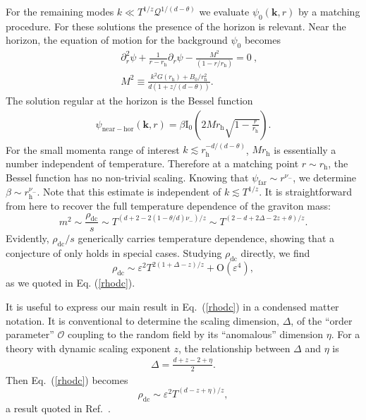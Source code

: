 \documentclass[10pt, oneside]{book}
\begin{document}
\begin{doublespace}
For the remaining modes $k \ll T^{1/z}\mathcal{Q}^{1/(d-\theta)}$ we evaluate $\psi_0(\mathbf{k},r)$ by a matching procedure. For these solutions the presence of the horizon is relevant. Near the horizon, the equation of motion for the background $\psi_0$ becomes
\begin{align}
  \label{eq:10}
  &\partial_r^2 \psi + \frac{1}{r-r_{\mathrm{h}}} \partial_r \psi - \frac{M^2}{(1-r/r_{\mathrm{h}})}=0~,\\
~~ &M^2 \equiv \frac{k^2 G(r_{\mathrm{h}}) + B_0/ r_{\mathrm{h}}^2}{d(1+z/(d-\theta))}.
\end{align}
The solution regular at the horizon is the Bessel function
\begin{align}
  \label{eq:11}
  \psi_{\mathrm{near-hor}}(\mathbf{k},r) = \beta \mathrm{I}_0 \left(2M r_{\mathrm{h}}\sqrt{1-\frac{r}{r_{\mathrm{h}}}} \right).
\end{align}
For the small momenta range of interest  $k \lesssim r_{\mathrm{h}}^{-d/(d-\theta)}$, $M r_{\mathrm{h}}$ is essentially a number independent of temperature. Therefore at a matching point $r \sim r_{\mathrm{h}}$, the Bessel function has no non-trivial scaling. Knowing that $\psi_{\mathrm{far}} \sim r^{\nu_-}$, we determine $\beta \sim r_{\mathrm{h}}^{\nu_-}$.    Note that this estimate is independent of $k\lesssim T^{1/z}$.
 It is straightforward from here to recover the full temperature dependence of the graviton mass: \begin{equation}
m^2 \sim \frac{\rho_{\mathrm{dc}}}{s} \sim T^{(d+2 - 2(1-\theta/d)\nu_-)/z} \sim T^{(2-d + 2\Delta - 2z+\theta)/z}.
\end{equation}Evidently, $\rho_{\mathrm{dc}}/s$ generically carries temperature dependence, showing that a conjecture of \cite{Davison:2013txa} only holds in special cases.  Studying $\rho_{\mathrm{dc}}$ directly, we find 
\begin{equation}
\rho_{\mathrm{dc}}\sim \varepsilon^2 T^{2(1+\Delta-z)/z} + \mathrm{O}\left(\varepsilon^4\right),
\end{equation} 
as we quoted in Eq. (\ref{rhodc}).

It is useful to express our main result in Eq.~(\ref{rhodc}) in a condensed matter notation. It is conventional to determine
the scaling dimension, $\Delta$, of the ``order parameter'' $\mathcal{O}$ coupling to the random field by its ``anomalous'' dimension $\eta$.
For a theory with dynamic scaling exponent $z$, the relationship between $\Delta$ and $\eta$ is \cite{ssbook}
\begin{align}
  \label{eq:11a}
  \Delta = \frac{d+z-2+\eta}{2}.
\end{align}
Then Eq.~(\ref{rhodc}) becomes
\begin{equation}
\rho_{\mathrm{dc}} \sim \varepsilon^2 T^{(d-z+\eta)/z},  \label{rhodca}
\end{equation}
a result quoted in Ref.~\cite{Hartnoll:2014gba}.


\end{doublespace}
\end{document}
